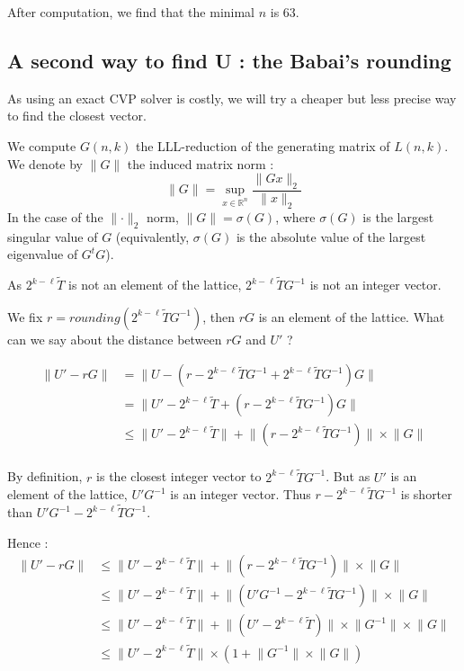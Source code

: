\documentclass[submission,svgnames,journal=tosc]{iacrtrans}
\begin{document}
After computation, we find that the minimal \(n\) is 63.


\subsection{A second way to find U : the Babai's rounding}

As using an exact CVP solver is costly, we will try a cheaper but less precise way to find the closest vector.

We compute \(G(n,k)\) the LLL-reduction of the generating matrix of \(L(n,k)\). We denote by  \(\rVert G \lVert\) the induced matrix norm :
\[\rVert G \lVert =  \sup_{x \in \mathbb{R}^n}\frac{\lVert Gx \rVert_2}{\lVert x \rVert_2}\]
In the case of the \(\lVert \cdot \rVert_2\) norm,
\(\rVert G \lVert = \sigma(G)\), where \(\sigma(G)\) is the largest singular
value of $G$ (equivalently, $\sigma(G)$ is the absolute value of the largest
eigenvalue of $G^{t} G$).


As \(2^{k-\ell}\widetilde{T}\) is not an element of the lattice, \(2^{k-\ell}\widetilde{T}G^{-1}\) is not an integer vector.

We fix \(r = rounding(2^{k-\ell}\widetilde{T}G^{-1}) \), then \(rG\) is an element of the lattice. What can we say about the distance between \(rG\) and \(U'\) ?

\begin{align*}
\lVert U' - rG \rVert &= \lVert U - (r-2^{k-\ell}\widetilde{T}G^{-1} + 2^{k-\ell}\widetilde{T}G^{-1})G \rVert\\
&= \lVert U' - 2^{k-\ell}\widetilde{T} + (r-2^{k-\ell}\widetilde{T}G^{-1})G \rVert\\
&\leqslant \lVert U' - 2^{k-\ell}\widetilde{T} \rVert + \lVert(r-2^{k-\ell}\widetilde{T}G^{-1})\rVert \times \lVert G\rVert\\	
\end{align*}

By definition, \(r\) is the closest integer vector to \(2^{k-\ell}\widetilde{T}G^{-1}\). But as \(U'\) is an element of the lattice, \(U'G^{-1}\) is an integer vector. Thus \(r-2^{k-\ell}\widetilde{T}G^{-1}\) is shorter than \(U'G^{-1}-2^{k-\ell}\widetilde{T}G^{-1}\).

Hence :
\begin{align*}
\lVert U' - rG \rVert &\leqslant \lVert U' - 2^{k-\ell}\widetilde{T} \rVert + \lVert(r-2^{k-\ell}\widetilde{T}G^{-1})\rVert \times \lVert G\rVert\\	
&\leqslant \lVert U' - 2^{k-\ell}\widetilde{T} \rVert + \lVert(U'G^{-1}-2^{k-\ell}\widetilde{T}G^{-1})\rVert \times \lVert G\rVert\\	
&\leqslant \lVert U' - 2^{k-\ell}\widetilde{T} \rVert + \lVert(U'-2^{k-\ell}\widetilde{T})\rVert \times \lVert G^{-1} \rVert  \times \lVert G\rVert\\
& 	\leqslant \lVert U' - 2^{k-\ell}\widetilde{T} \rVert \times (1 +\lVert G^{-1} \rVert  \times \lVert G\rVert )\\
\end{align*}
\end{document}
